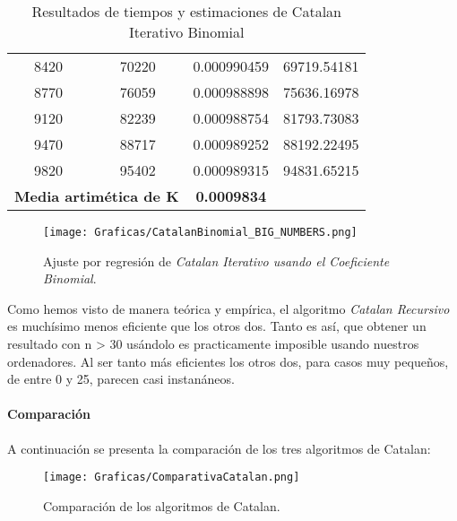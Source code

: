 \documentclass[a4paper,12pt]{article} %
\begin{document}
\begin{table}[H]
{\begin{tabular}{|c|c|c|c|}
			8420                                               & 70220                & 0.000990459              & 69719.54181                                          \\
			8770                                               & 76059                & 0.000988898              & 75636.16978                                          \\
			9120                                               & 82239                & 0.000988754              & 81793.73083                                          \\
			9470                                               & 88717                & 0.000989252              & 88192.22495                                          \\
			9820                                               & 95402                & 0.000989315              & 94831.65215                                          \\
			\hline
			\multicolumn{2}{l}{\textbf{Media artimética de K}} & \textbf{0.0009834}                                                                                     \\
			\hline
		\end{tabular}
	}
	\caption{Resultados de tiempos y estimaciones de Catalan Iterativo Binomial}
	\label{tab:tiempos}
\end{table}

\begin{figure}[H]
	\centering
	\texttt{[image: Graficas/CatalanBinomial\_BIG\_NUMBERS.png]}
	\caption{Ajuste por regresión de \textit{Catalan Iterativo usando el Coeficiente Binomial}.}
\end{figure}

Como hemos visto de manera teórica y empírica, el algoritmo \textit{Catalan Recursivo} es
muchísimo menos eficiente que los otros dos. Tanto es así, que obtener un resultado con n > 30 usándolo
es practicamente imposible usando nuestros ordenadores.
Al ser tanto más eficientes los otros dos, para casos muy pequeños, de entre 0 y 25, parecen casi instanáneos.

\paragraph{Comparación}


A continuación se presenta la comparación de los tres algoritmos de Catalan:

\begin{figure}[H]
	\centering
	\texttt{[image: Graficas/ComparativaCatalan.png]}
	\caption{Comparación de los algoritmos de Catalan.}
\end{figure}
\end{document}

